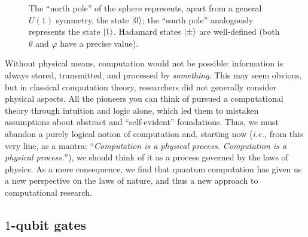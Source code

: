 \begin{figure}
    \centering
    
    \caption{The ``north pole'' of the sphere represents, apart from a general $U(1)$ symmetry, the state $\ket{0}$; the ``south pole'' analogously represents the state $\ket{1}$. Hadamard states $\ket{\pm}$ are well-defined (both $\theta$ and $\varphi$ have a precise value).}
    \label{fig:bloch sphere poles}
\end{figure}

\begin{tcolorbox}[ colframe=palette-main, title= \textbf{Computation is a physical process...}] %
    Without physical means, computation would not be possible: information is always stored, transmitted, and processed by \textit{something}. This may seem obvious, but in classical computation theory, researchers did not generally consider physical aspects. All the pioneers you can think of pursued a computational theory through intuition and logic alone, which led them to mistaken assumptions about abstract and ``self-evident'' foundations.
    Thus, we must abandon a purely logical notion of computation and, starting now (\textit{i.e.,} from this very line, as a mantra: ``\textit{Computation is a physical process. Computation is a physical process.}''), we should think of it as a process governed by the laws of physics. As a mere consequence, we find that quantum computation has given us a new perspective on the laws of nature, and thus a new approach to computational research.
\end{tcolorbox}

\subsection{$1$-qubit gates}

